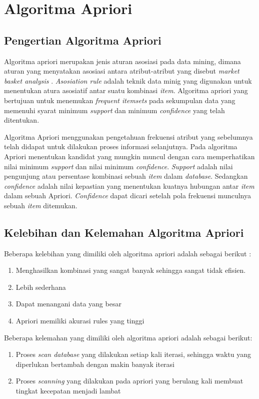 \section{Algoritma Apriori}
\subsection{Pengertian Algoritma Apriori}
Algoritma apriori merupakan jenis aturan asosiasi pada data mining, dimana aturan yang menyatakan asosiasi antara atribut-atribut yang disebut \textit{market basket analysis} \cite{ye2006parallel}. \textit{Asosiation rule} adalah teknik data minig yang digunakan untuk menentukan atura asosiatif antar suatu kombinasi \textit{item}. Algoritma apriori yang bertujuan untuk menemukan \textit{frequent itemsets} pada sekumpulan data yang memenuhi syarat minimum \textit{support} dan minimum \textit{confidence} yang telah ditentukan.
\par
Algoritma Apriori menggunakan pengetahuan frekuensi atribut yang  sebelumnya telah didapat untuk dilakukan proses informasi selanjutnya. Pada algoritma Apriori  menentukan kandidat yang mungkin muncul dengan cara memperhatikan nilai minimum \textit{support} dan nilai minimum \textit{confidence}. \textit{Support} adalah nilai pengunjung atau persentase kombinasi sebuah \textit{item} dalam \textit{database}. Sedangkan \textit{confidence} adalah nilai kepastian yang menentukan kuatnya hubungan antar \textit{item} dalam sebuah Apriori. \textit{Confidence} dapat dicari setelah pola frekuensi munculnya sebuah \textit{item} ditemukan.
\subsection{Kelebihan dan Kelemahan Algoritma Apriori}
\par Beberapa kelebihan yang dimiliki oleh algoritma apriori adalah sebagai berikut \cite{fauzy2016penerapan}:
 \begin{enumerate}
\item Menghasilkan kombinasi yang sangat banyak sehingga sangat tidak efisien. 
\item Lebih sederhana
\item Dapat menangani data yang besar
\item Apriori memiliki akurasi rules yang tinggi
\end{enumerate}

\par Beberapa kelemahan yang dimiliki oleh algoritma apriori adalah sebagai berikut:
 \begin{enumerate}
\item Proses \textit{scan database} yang dilakukan setiap kali iterasi, sehingga waktu yang diperlukan bertambah dengan makin banyak iterasi
\item Proses \textit{scanning} yang
dilakukan pada apriori yang berulang kali membuat tingkat kecepatan menjadi lambat

\end{enumerate}

